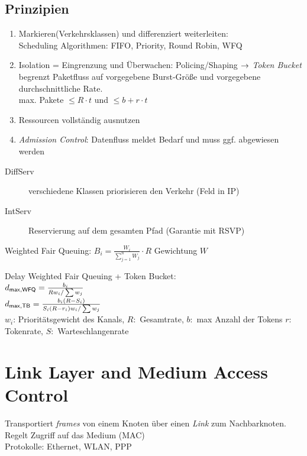 \documentclass[fs, footer]{latex4ei}
\begin{document}
\begin{multicols*}{4}
{		\subsection{Prinzipien}
		\begin{enumerate}
			\item Markieren(Verkehrsklassen) und differenziert weiterleiten:\\
				Scheduling Algorithmen: FIFO, Priority, Round Robin, WFQ\\
			\item Isolation = Eingrenzung und Überwachen: Policing/Shaping $\rightarrow$
					\emph{Token Bucket} begrenzt Paketfluss auf vorgegebene Burst-Größe und vorgegebene durchschnittliche Rate. \\
					max. Pakete $\le R \cdot t$ und $\le b + r \cdot t$
			\item Ressourcen vollständig ausnutzen
			\item \emph{Admission Control}: Datenfluss meldet Bedarf und muss ggf. abgewiesen werden
		\end{enumerate}


	\begin{description}
		\item[DiffServ] verschiedene Klassen priorisieren den Verkehr (Feld in IP)
		\item[IntServ] Reservierung auf dem gesamten Pfad (Garantie mit RSVP)
	\end{description}



	Weighted Fair Queuing:
	$B_i = \frac{W_i}{\sum_{j=1}^{n} W_j} \cdot R$ \qquad Gewichtung $W$

	Delay Weighted Fair Queuing + Token Bucket:\\
	$d_{\sf max, WFQ} = \frac{b_i}{R w_i / \sum w_j}$\\
	$d_{\sf max, TB} = \frac{b_i (R- S_i)}{S_i(R - r_i) w_i / \sum w_j}$\\

	$w_i$: Prioritätsgewicht des Kanals, $R:$ Gesamtrate, $b:$ max Anzahl der Tokens
	$r:$ Tokenrate, $S:$ Warteschlangenrate
}

\section{Link Layer and Medium Access Control}
Transportiert \emph{frames} von einem Knoten über einen \emph{Link} zum Nachbarknoten. Regelt Zugriff auf das Medium (MAC)\\
Protokolle: Ethernet, WLAN, PPP


\end{multicols*}
\end{document}
